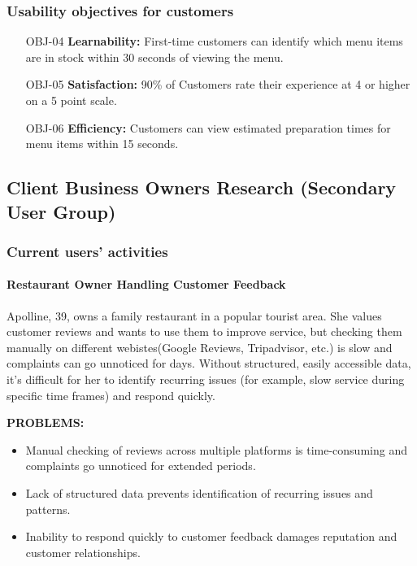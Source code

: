 \documentclass[]{VUMIFTemplateClass}
\newcommand{\suggestioncomment}[1]{%
    \definecolor{lime}{RGB}{50,205,50}%
    \begin{tcolorbox}[colback=lime!15, colframe=lime!60, arc=0pt, outer arc=0pt, boxrule=1pt, left=3pt, right=3pt, top=3pt, bottom=3pt]
        \textbf{\textcolor{lime!70!black}{SUGGESTION:}} #1
    \end{tcolorbox}%
}
\newcommand{\subsubsubsection}[1]{\paragraph{#1}}
\begin{document}
\subsubsection{Usability objectives for customers}
\begin{itemize}
    \item[OBJ-04]\label{OBJ-04} \textbf{Learnability:} First-time customers can identify which menu items are in stock within 30 seconds of viewing the menu.
    \item[OBJ-05]\label{OBJ-05} \textbf{Satisfaction:} 90\% of Customers rate  their experience at 4 or higher on a 5 point scale.
     \item[OBJ-06]\label{OBJ-06} \textbf{Efficiency:} Customers can view estimated preparation times for menu items within 15 seconds.
\end{itemize}

\subsection{Client Business Owners Research (Secondary User Group)}

\subsubsection{Current users' activities}

\subsubsubsection{Restaurant Owner Handling Customer Feedback}
\label{subsubsubsec:owner-feedback}

Apolline, 39, owns a family restaurant in a popular tourist area. She values
customer reviews and wants to use them to improve service, but checking them
manually on different webistes(Google Reviews, Tripadvisor, etc.) is slow and complaints can go unnoticed for days. Without structured, easily accessible data, it’s difficult for her to identify recurring issues (for example, slow service during specific time frames) and respond quickly.

\textbf{PROBLEMS:}
\begin{itemize}
    \item Manual checking of reviews across multiple platforms is time-consuming and complaints go unnoticed for extended periods.
    \item Lack of structured data prevents identification of recurring issues and patterns.
    \item Inability to respond quickly to customer feedback damages reputation and customer relationships.
\end{itemize}
\end{document}
